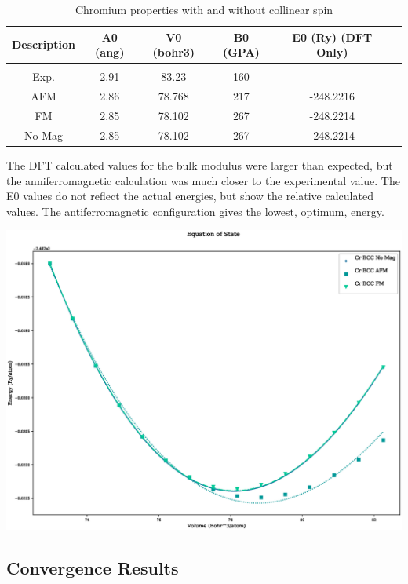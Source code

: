 \begin{table}[h]
\begin{center}
\begin{tabular}{c c c c c c}
\hline
Description & A0 (ang) & V0 (bohr3) & B0 (GPA) & E0 (Ry) (DFT Only) \\
\hline \\
Exp. & 2.91 & 83.23 & 160 & - \\
AFM & 2.86 & 78.768 & 217 & -248.2216 \\
FM & 2.85 & 78.102 & 267 & -248.2214 \\
No Mag & 2.85 & 78.102 & 267 & -248.2214 \\
\end{tabular}
\end{center}
\caption{Chromium properties with and without collinear spin}
\end{table}

The DFT calculated values for the bulk modulus were larger than expected, but the anniferromagnetic calculation was much closer to the experimental value.  The E0 values do not reflect the actual energies, but show the relative calculated values.  The antiferromagnetic configuration gives the lowest, optimum, energy.


\begin{center}
\includegraphics[scale=0.35]{chapters/results_dft_reference_db/qeeos_plots/cr-mag/eos.eps}
\end{center}






\subsection{Convergence Results}


